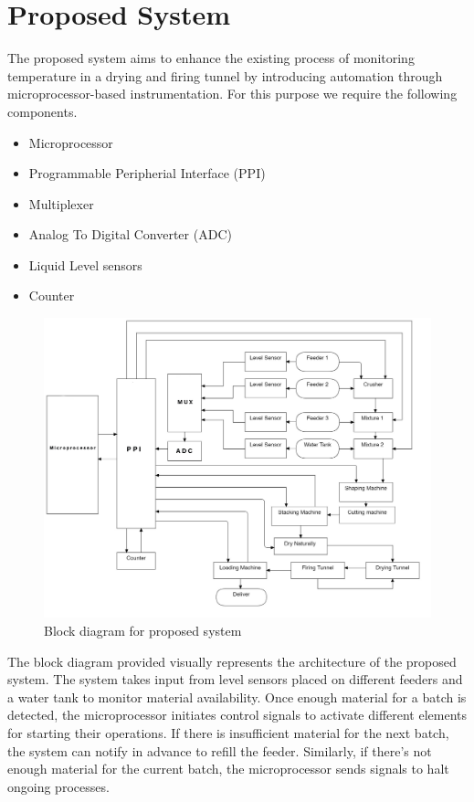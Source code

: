 \section{Proposed System}
\vspace{1em}  
The proposed system aims to enhance the existing process of monitoring temperature in a drying and firing tunnel by introducing automation through microprocessor-based instrumentation. For this purpose we require the following components.
\vspace{1em}
\begin{itemize}
    \item Microprocessor
    \item Programmable Peripherial Interface (PPI) 
    \item Multiplexer
    \item Analog To Digital Converter (ADC)
    \item Liquid Level sensors
    \item Counter
\end{itemize}
\vspace{2em}
\begin{figure}[h]
    \centering
    \includegraphics[width=1\textwidth]{img/fc.jpg}
    \caption{Block diagram for proposed system}
\end{figure}
\vspace{5em}
The block diagram provided visually represents the architecture of the proposed system. The system takes input from level sensors placed on different feeders and a water tank to monitor material availability. Once enough material for a batch is detected, the microprocessor initiates control signals to activate different elements for starting their operations. If there is insufficient material for the next batch, the system can notify in advance to refill the feeder. Similarly, if there's not enough material for the current batch, the microprocessor sends signals to halt ongoing processes.

